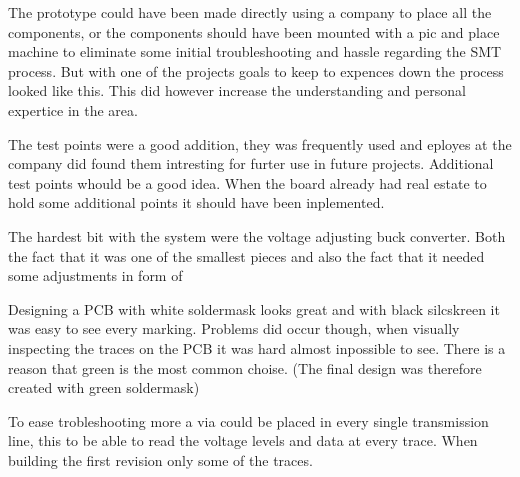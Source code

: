 The prototype could have been made directly using a company to place all the components, or the components should have been mounted with a pic and place machine to eliminate some initial troubleshooting and hassle regarding the SMT process. But with one of the projects goals to keep to expences down the process looked like this. This did however increase the understanding and personal expertice in the area. 

The test points were a good addition, they was frequently used and eployes at the company did found them intresting for furter use in future projects.
Additional test points whould be a good idea. When the board already had real estate to hold some additional points it should have been inplemented. 

The hardest bit with the system were the voltage adjusting buck converter. Both the fact that it was one of the smallest pieces and also the fact that it needed some adjustments in form of 

Designing a PCB with white soldermask looks great and with black silcskreen it was easy to see every marking. Problems did occur though, when visually inspecting the traces on the PCB it was hard almost inpossible to see. There is a reason that green is the most common choise. (The final design was therefore created with green soldermask)

To ease trobleshooting more a via could be placed in every single transmission line, this to be able to read the voltage levels and data at every trace. When building the first revision only some of the traces.